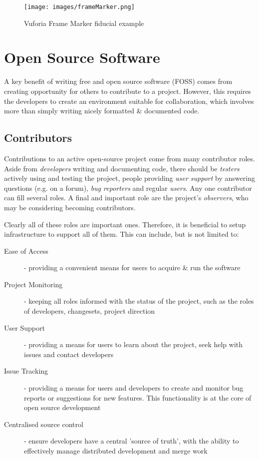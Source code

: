 \begin{figure}[ht!]
\centering
\texttt{[image: images/frameMarker.png]}
\caption{Vuforia Frame Marker fiducial example \cite{vuforia}}
\label{im:frameMarker}
\end{figure}

\clearpage




\section{Open Source Software}

A key benefit of writing free and open source software (FOSS) comes from creating opportunity for others to contribute to a project. However, this requires the developers to create an environment suitable for collaboration, which involves more than simply writing nicely formatted \& documented code.
\\

\subsection{Contributors}

Contributions to an active open-source project come from many contributor roles. Aside from \textit{developers} writing and documenting code, there should be \textit{testers} actively using and testing the project, people providing \textit{user support} by answering questions (e.g. on a forum), \textit{bug reporters} and regular \textit{users}. Any one contributor can fill several roles. A final and important role are the project's \textit{observers}, who may be considering becoming contributors.

Clearly all of these roles are important ones. Therefore, it is beneficial to setup infrastructure to support all of them. This can include, but is not limited to:
\begin{description}
	\item[Ease of Access] - providing a convenient means for users to acquire \& run the software
	\item[Project Monitoring] - keeping all roles informed with the status of the project, such as the roles of developers, changesets, project direction
	\item[User Support] - providing a means for users to learn about the project, seek help with issues and contact developers
	\item[Issue Tracking] - providing a means for users and developers to create and monitor bug reports or suggestions for new features. This functionality is at the core of open source development
	\item[Centralised source control] - ensure developers have a central 'source of truth', with the ability to effectively manage distributed development and merge work
\end{description}

